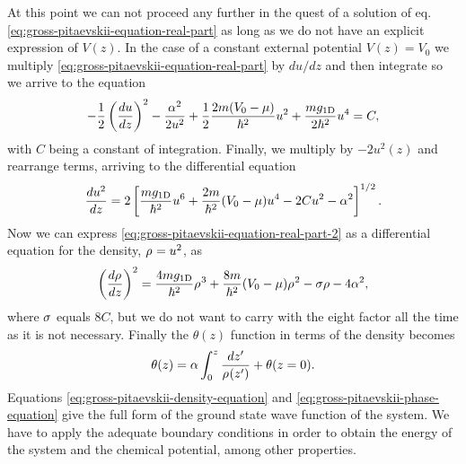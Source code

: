 At this point we can not proceed any further in the quest of a solution of eq.
\eqref{eq:gross-pitaevskii-equation-real-part} as long as we do not have an
explicit expression of $V(z)$. In the case of a constant external potential
$V(z) = V_0$ we multiply \eqref{eq:gross-pitaevskii-equation-real-part} by $du /
  dz$ and then integrate so we arrive to the equation
%
\begin{equation}
  -\frac{1}{2} \left( \frac{du}{dz} \right)^2 - \frac{\alpha^2}{2 u^2} +
  \frac{1}{2} \frac{2m (V_0 - \mu)}{\hbar^2} u^2 + \frac{m g_{ \mathrm{1D} }}{2 \hbar^2} u^4 = C,
\end{equation}
%
with $C$ being a constant of integration. Finally, we multiply by $-2u^2(z)$ and
rearrange terms, arriving to the differential equation
%
\begin{equation}
  \label{eq:gross-pitaevskii-equation-real-part-2}
  \frac{d u^2}{dz} = 2 \left[ \frac{m g_{ \mathrm{1D} }}{\hbar^2} u^6 + \frac{2m}{\hbar^2} (V_0 - \mu) u^4 - 2 C u^2 - \alpha^2  \right]^{1/2}.
\end{equation}
%
Now we can express \eqref{eq:gross-pitaevskii-equation-real-part-2} as a
differential equation for the density, ${\rho_{}} = u^2$, as
%
\begin{align}
  \label{eq:gross-pitaevskii-density-equation}
  \left( \frac{d{\rho_{}}}{dz} \right)^2 = \frac{4 m g_{ \mathrm{1D} }}{\hbar^2} {\rho_{}}^3 + \frac{8 m}{\hbar^2} (V_0 - \mu) {\rho_{}}^2 - \sigma \rho - 4\alpha^2,
\end{align}
%
where $\sigma$ equals $8C$, but we do not want to carry with the eight factor
all the time as it is not necessary. Finally the $\theta(z)$ function in terms
of the density becomes
%
\begin{equation}
  \label{eq:gross-pitaevskii-phase-equation}
  \theta(z) = \alpha \int_{0}^{z} \frac{dz'}{{\rho_{}}(z')} + \theta(z=0).
\end{equation}
%
Equations \eqref{eq:gross-pitaevskii-density-equation} and
\eqref{eq:gross-pitaevskii-phase-equation} give the full form of the ground
state wave function of the system. We have to apply the adequate boundary
conditions in order to obtain the energy of the system and the chemical
potential, among other properties.

